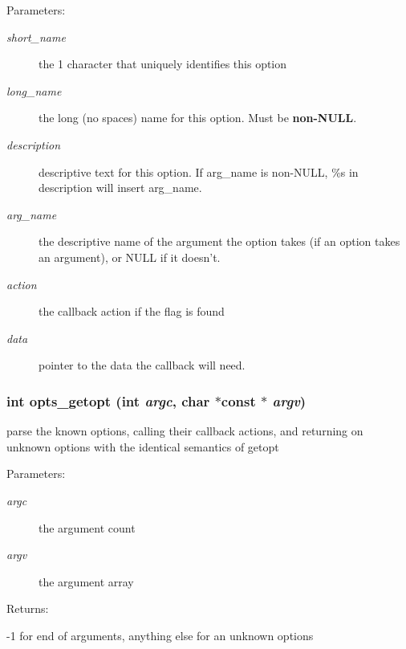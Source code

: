 \begin{Desc}
\item[Parameters: ]\par
\begin{description}
\item[{\em 
short\_\-name}]the 1 character that uniquely identifies this option \item[{\em 
long\_\-name}]the long (no spaces) name for this option. Must be {\bf non-NULL}. \item[{\em 
description}]descriptive text for this option. If arg\_\-name is non-NULL, \%s in description will insert arg\_\-name. \item[{\em 
arg\_\-name}]the descriptive name of the argument the option takes (if an option takes an argument), or NULL if it doesn't. \item[{\em 
action}]the callback action if the flag is found \item[{\em 
data}]pointer to the data the callback will need. \end{description}
\end{Desc}
\subsubsection{\setlength{\rightskip}{0pt plus 5cm}int opts\_\-getopt (int {\em argc}, char $\ast$const $\ast$ {\em argv})}\label{opts__utils_8h_a13}


parse the known options, calling their callback actions, and returning on unknown options with the identical semantics of getopt

\begin{Desc}
\item[Parameters: ]\par
\begin{description}
\item[{\em 
argc}]the argument count \item[{\em 
argv}]the argument array \end{description}
\end{Desc}
\begin{Desc}
\item[Returns: ]\par
-1 for end of arguments, anything else for an unknown options \end{Desc}
